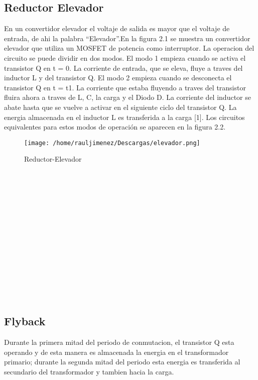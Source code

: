 \documentclass[11pt]{article}
\begin{document}
\subsection{Reductor Elevador} 
En un convertidor elevador el voltaje de salida es mayor que el voltaje de entrada, de ahi  la  palabra  “Elevador”.En  la  figura  2.1  se  muestra  un  convertidor  elevador  que  utiliza  un  MOSFET  de  potencia  como  interruptor.  La  operacion  del  circuito  se  puede  dividir  en  dos  modos. El modo 1 empieza cuando se activa el transistor Q en t = 0. La corriente de entrada, que  se  eleva,  fluye  a  traves  del  inductor  L  y  del  transistor  Q.  El  modo  2  empieza  cuando  se  desconecta  el  transistor  Q  en  t  =  t1.  La  corriente  que  estaba  fluyendo  a  traves  del  transistor  fluira ahora a traves de L, C, la carga y el Diodo D. La corriente del inductor se abate hasta que  se  vuelve  a  activar  en  el  siguiente  ciclo  del  transistor  Q.  La  energia  almacenada  en  el  inductor  L  es  transferida  a  la  carga  [1].  Los  circuitos  equivalentes  para  estos  modos  de  operación se aparecen en la figura 2.2.\\
\begin{figure}[htp]
\centering
\texttt{[image: /home/rauljimenez/Descargas/elevador.png]}
\caption{Reductor-Elevador}
\label{}
\end{figure}\\\\\\\\\\\\\\\\\\\\\\\\\\

\subsection{Flyback}
Durante  la  primera mitad del periodo de conmutacion, el transistor Q esta operando y de esta manera es almacenada la energia en el transformador primario; durante la segunda mitad del periodo esta energia  es  transferida  al  secundario  del  transformador  y  tambien  hacia  la  carga.\\
\end{document}
